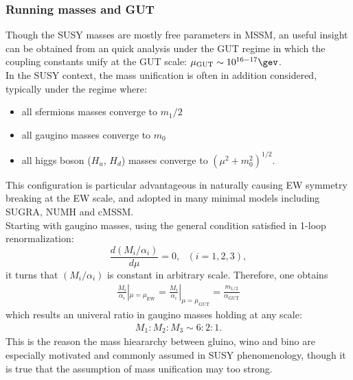 \subsubsection{Running masses and GUT}
Though the SUSY masses are mostly free parameters in MSSM, 
an useful insight can be obtained from an quick analysis under the GUT regime in which the coupling constants unify at the GUT scale: $\mu_{\mathrm{GUT}}\sim 10^{16-17}\gev$. \\

In the SUSY context, the mass unification is often in addition considered, typically under the regime where:
\begin{itemize}
\item all sfermions masses converge to $m_1/2$
\item all gaugino masses converge to $m_0$
\item all higgs boson ($H_u$, $H_d$) masses converge to $(\mu^2+m_0^2)^{1/2}$.
\end{itemize}
This configuration is particular advantageous in naturally causing EW symmetry breaking at the EW scale, and adopted in many minimal models including SUGRA, NUMH and cMSSM. \\

Starting with gaugino masses, using the general condition satisfied in 1-loop renormalization:
$$
\frac{d(M_i/\alpha_i)}{d\mu} = 0, \,\,\,\, (i=1,2,3),
$$
it turns that $(M_i/\alpha_i)$ is constant in arbitrary scale. Therefore, one obtains
\begin{align}
\frac{M_i}{\alpha_i}|_{\mu=\mu_{\mathrm{EW}}}  = \frac{M_i}{\alpha_i}|_{\mu=\mu_{\mathrm{GUT}}} = \frac{m_{1/2}}{\alpha_{\mathrm{GUT}}}
\end{align}
which results an univeral ratio in gaugino masses holding at any scale:
\begin{align}
M_1 : M_2 : M_3 \sim 6:2:1.
\end{align}
This is the reason the mass hieararchy between gluino, wino and bino are especially motivated and commonly assumed in SUSY phenomenology, though it is true that the assumption of mass unification may too strong. \\

